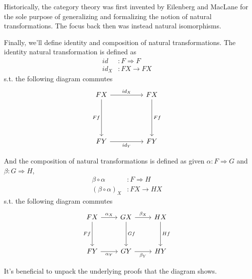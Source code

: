 \documentclass[12pt]{article}
\theoremstyle{plain}
\theoremstyle{definition}
\theoremstyle{remark}
\begin{document}
Historically, the category theory was first invented by Eilenberg and MacLane for the sole purpose of generalizing and formalizing the notion of natural transformations. The focus back then was instead natural isomorphisms.

Finally, we'll define identity and composition of natural transformations. The identity natural transformation is defined as
\begin{align*}
  id &: F \Rightarrow F \\
  id_X &: F X \to F X
\end{align*}
s.t. the following diagram commutes
\[\begin{tikzcd}
	FX && FX \\
	\\
  \\
	FY && FY
	\arrow["{id_X}", from=1-1, to=1-3]
	\arrow["Ff"', from=1-1, to=4-1]
	\arrow["Ff", from=1-3, to=4-3]
	\arrow["{id_Y}"', from=4-1, to=4-3]
\end{tikzcd}\]

And the composition of natural transformations is defined as given $\alpha: F \Rightarrow G$ and $\beta: G \Rightarrow H$,
\begin{align*}
  \beta \circ \alpha &: F \Rightarrow H \\
  (\beta \circ \alpha)_X &: F X \to H X
\end{align*}
s.t. the following diagram commutes
\[\begin{tikzcd}
	FX & GX & HX \\
	\\
	FY & GY & HY
	\arrow["{\alpha_X}", from=1-1, to=1-2]
	\arrow["Ff"', from=1-1, to=3-1]
	\arrow["{\beta_X}", from=1-2, to=1-3]
	\arrow["Gf", from=1-2, to=3-2]
	\arrow["Hf", from=1-3, to=3-3]
	\arrow["{\alpha_Y}"', from=3-1, to=3-2]
	\arrow["{\beta_Y}"', from=3-2, to=3-3]
\end{tikzcd}\]

It's beneficial to unpack the underlying proofs that the diagram shows.
\end{document}
